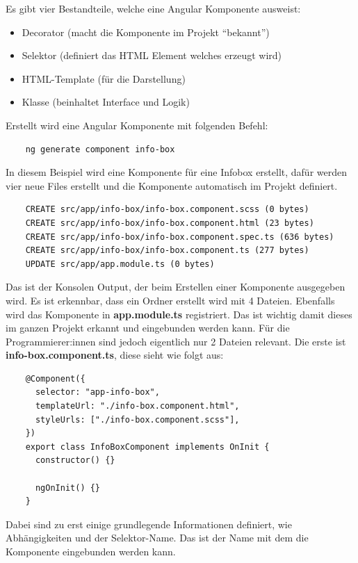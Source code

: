 Es gibt vier Bestandteile, welche eine Angular Komponente ausweist:

\begin{itemize}
    \item Decorator (macht die Komponente im Projekt “bekannt”)
    \item Selektor (definiert das HTML Element welches erzeugt wird)
    \item HTML-Template (für die Darstellung)
    \item Klasse (beinhaltet Interface und Logik)
\end{itemize}

Erstellt wird eine Angular Komponente mit folgenden Befehl:

\begin{lstlisting}
    ng generate component info-box
\end{lstlisting}

In diesem Beispiel wird eine Komponente für eine Infobox erstellt, dafür werden vier neue Files erstellt und die Komponente automatisch im Projekt definiert.

\begin{lstlisting}
    CREATE src/app/info-box/info-box.component.scss (0 bytes)
    CREATE src/app/info-box/info-box.component.html (23 bytes)
    CREATE src/app/info-box/info-box.component.spec.ts (636 bytes)
    CREATE src/app/info-box/info-box.component.ts (277 bytes)
    UPDATE src/app/app.module.ts (0 bytes)
\end{lstlisting}

Das ist der Konsolen Output, der beim Erstellen einer Komponente ausgegeben wird. Es ist erkennbar, dass ein Ordner erstellt wird mit 4 Dateien. Ebenfalls wird das Komponente in \textbf{app.module.ts} registriert. Das ist wichtig damit dieses im ganzen Projekt erkannt und eingebunden werden kann.
\newpage
Für die Programmierer:innen sind jedoch eigentlich nur 2 Dateien relevant.
Die erste ist \textbf{info-box.component.ts}, diese sieht wie folgt aus:

\begin{lstlisting}
    @Component({
      selector: "app-info-box",
      templateUrl: "./info-box.component.html",
      styleUrls: ["./info-box.component.scss"],
    })
    export class InfoBoxComponent implements OnInit {
      constructor() {}
    
      ngOnInit() {}
    }
\end{lstlisting}

Dabei sind zu erst einige grundlegende Informationen definiert, wie Abhängigkeiten und der Selektor-Name. Das ist der Name mit dem die Komponente eingebunden werden kann.

